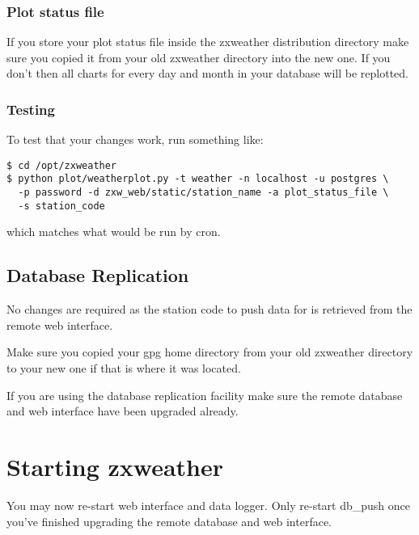 \documentclass[a4paper,10pt,draft]{book}
\newcommand{\partnumber}{\ifthenelse{\isundefined{\projectnum}}{}{\projectnum-\docnum	\ifthenelse{\equal{\docrev}{001}}{}{.\docrev}}}
\newcommand*\cleartoleftpage{%
  \clearpage
  \ifodd\value{page}\hbox{}\newpage\fi
}
\begin{document}
\subsubsection{Plot status file}
If you store your plot status file inside the zxweather distribution directory make sure you copied it from your old zxweather directory into the new one. If you don't then all charts for every day and month in your database will be replotted.

\subsubsection{Testing}
To test that your changes work, run something like:
\begin{verbatim}
$ cd /opt/zxweather
$ python plot/weatherplot.py -t weather -n localhost -u postgres \
  -p password -d zxw_web/static/station_name -a plot_status_file \
  -s station_code
\end{verbatim}
which matches what would be run by cron.

\subsection{Database Replication}
No changes are required as the station code to push data for is retrieved from the remote web interface.

Make sure you copied your gpg home directory from your old zxweather directory to your new one if that is where it was located.

If you are using the database replication facility make sure the remote database and web interface have been upgraded already.

\section{Starting zxweather}
You may now re-start web interface and data logger. Only re-start db\_push once you've finished upgrading the remote database and web interface.


\cleartoleftpage
\thispagestyle{empty}
\begin{flushright}
\null
\vfill
\tt \partnumber
\end{flushright}
\end{document}
